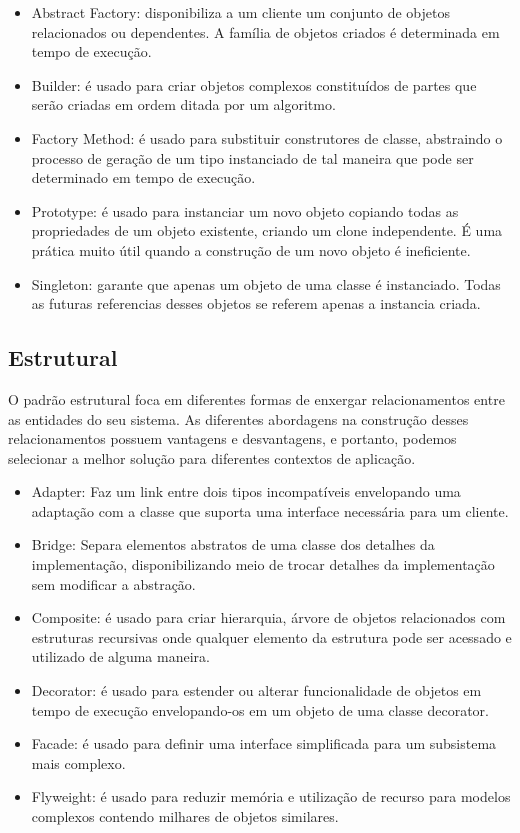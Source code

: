 \begin{itemize}
	\item Abstract Factory: disponibiliza a um cliente um conjunto de objetos relacionados ou dependentes. A família de objetos criados é determinada em tempo de execução.
	\item Builder: é usado para criar objetos complexos constituídos de partes que serão criadas em ordem ditada por um algoritmo. 
	\item Factory Method: é usado para substituir construtores de classe, abstraindo o processo de geração de um tipo instanciado de tal maneira que pode ser determinado em tempo de execução.
	\item Prototype: é usado para instanciar um novo objeto copiando todas as propriedades de um objeto existente, criando um clone independente. É uma prática muito útil quando a construção de um novo objeto é ineficiente.
	\item Singleton: garante que apenas um objeto de uma classe é instanciado. Todas as futuras referencias desses objetos se referem apenas a instancia criada.
\end{itemize}


\subsection{Estrutural}
O padrão estrutural foca em diferentes formas de enxergar relacionamentos entre as entidades do seu sistema. As diferentes abordagens na construção desses relacionamentos possuem vantagens e desvantagens, e portanto, podemos selecionar a melhor solução para diferentes contextos de aplicação.  

\begin{itemize}
	\item Adapter: Faz um link entre dois tipos incompatíveis envelopando uma adaptação com a classe que suporta uma interface necessária para um cliente.
	\item Bridge: Separa elementos abstratos de uma classe dos detalhes da implementação, disponibilizando meio de trocar detalhes da implementação sem modificar a abstração.
	\item Composite: é usado para criar hierarquia, árvore de objetos relacionados com estruturas recursivas onde qualquer elemento da estrutura pode ser acessado e utilizado de alguma maneira.
	\item Decorator: é usado para estender ou alterar funcionalidade de objetos em tempo de execução envelopando-os em um objeto de uma classe decorator.
	\item Facade: é usado para definir uma interface simplificada para um subsistema mais complexo.
	\item Flyweight: é usado para reduzir memória e utilização de recurso para modelos complexos contendo milhares de objetos similares.
\end{itemize}


